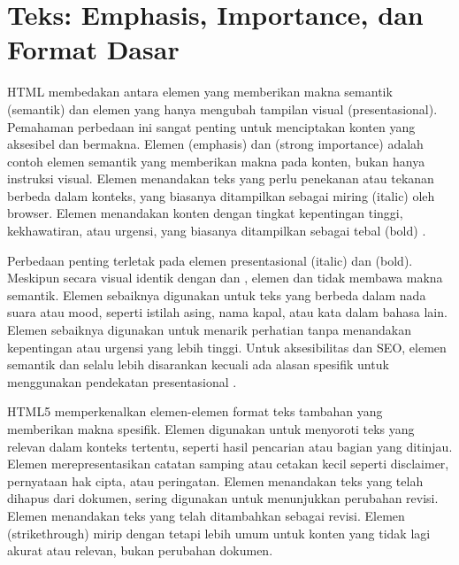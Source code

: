 ﻿\section{Teks: Emphasis, Importance, dan Format Dasar}

HTML membedakan antara elemen yang memberikan makna semantik (semantik) dan elemen yang hanya mengubah tampilan visual (presentasional). Pemahaman perbedaan ini sangat penting untuk menciptakan konten yang aksesibel dan bermakna. Elemen  (emphasis) dan  (strong importance) adalah contoh elemen semantik yang memberikan makna pada konten, bukan hanya instruksi visual. Elemen  menandakan teks yang perlu penekanan atau tekanan berbeda dalam konteks, yang biasanya ditampilkan sebagai miring (italic) oleh browser. Elemen  menandakan konten dengan tingkat kepentingan tinggi, kekhawatiran, atau urgensi, yang biasanya ditampilkan sebagai tebal (bold) \cite{mdnHtmlIntro}.

Perbedaan penting terletak pada elemen presentasional  (italic) dan  (bold). Meskipun secara visual identik dengan  dan , elemen  dan  tidak membawa makna semantik. Elemen  sebaiknya digunakan untuk teks yang berbeda dalam nada suara atau mood, seperti istilah asing, nama kapal, atau kata dalam bahasa lain. Elemen  sebaiknya digunakan untuk menarik perhatian tanpa menandakan kepentingan atau urgensi yang lebih tinggi. Untuk aksesibilitas dan SEO, elemen semantik  dan  selalu lebih disarankan kecuali ada alasan spesifik untuk menggunakan pendekatan presentasional \cite{mdnAccessibility}.

HTML5 memperkenalkan elemen-elemen format teks tambahan yang memberikan makna spesifik. Elemen  digunakan untuk menyoroti teks yang relevan dalam konteks tertentu, seperti hasil pencarian atau bagian yang ditinjau. Elemen  merepresentasikan catatan samping atau cetakan kecil seperti disclaimer, pernyataan hak cipta, atau peringatan. Elemen  menandakan teks yang telah dihapus dari dokumen, sering digunakan untuk menunjukkan perubahan revisi. Elemen  menandakan teks yang telah ditambahkan sebagai revisi. Elemen  (strikethrough) mirip dengan  tetapi lebih umum untuk konten yang tidak lagi akurat atau relevan, bukan perubahan dokumen.

